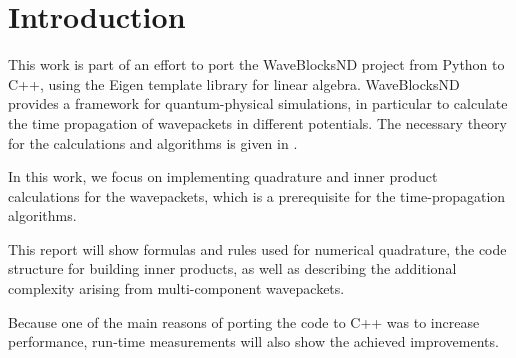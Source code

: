 \section{Introduction}

This work is part of an effort to port the WaveBlocksND project
\cite{waveblocksnd} from Python to C++, using the Eigen template library for
linear algebra.
WaveBlocksND provides a framework for quantum-physical simulations, in
particular to calculate the time propagation of wavepackets in different
potentials.
The necessary theory for the calculations and algorithms is given in
\cite{B_master_thesis}.

In this work, we focus on implementing quadrature and inner product calculations
for the wavepackets, which is a prerequisite for the time-propagation
algorithms.

This report will show formulas and rules used for numerical quadrature,
the code structure for building inner products, as well as describing the
additional complexity arising from multi-component wavepackets.

Because one of the main reasons of porting the code to C++ was to increase
performance, run-time measurements will also show the achieved improvements.
